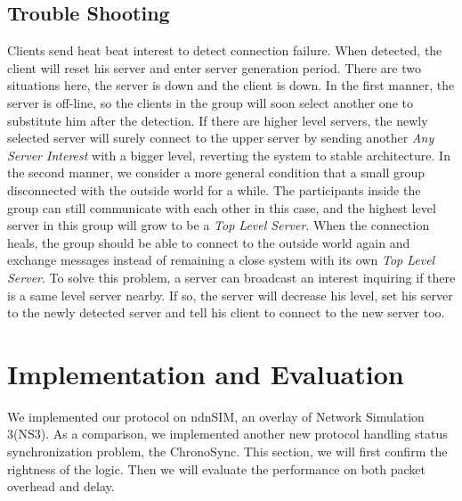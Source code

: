 \documentclass[conference]{IEEEtran}
\begin{document}
\subsection{Trouble Shooting}
\label{trouble_shooting}
Clients send heat beat interest to detect connection failure. When detected, the client will reset his server and enter server generation period. There are two situations here, the server is down and the client is down. In the first manner, the server is off-line, so the clients in the group will soon select another one to substitute him after the detection. If there are higher level servers, the newly selected server will surely connect to the upper server by sending another \emph{Any Server Interest} with a bigger level, reverting the system to stable architecture. In the second manner, we consider a more general condition that a small group disconnected with the outside world for a while. The participants inside the group can still communicate with each other in this case, and the highest level server in this group will grow to be a \emph{Top Level Server}. When the connection heals, the group should be able to connect to the outside world again and exchange messages instead of remaining a close system with its own \emph{Top Level Server}. To solve this problem, a server can broadcast an interest inquiring if there is a same level server nearby. If so, the server will decrease his level, set his server to the newly detected server and tell his client to connect to the new server too.

\section{Implementation and Evaluation}
\label{implementation}
We implemented our protocol on ndnSIM, an overlay of Network Simulation 3(NS3)\cite{ns3}. As a comparison, we implemented another new protocol handling status synchronization problem, the ChronoSync. This section, we will first confirm the rightness of the logic. Then we will evaluate the performance on both packet overhead and delay.
\end{document}
